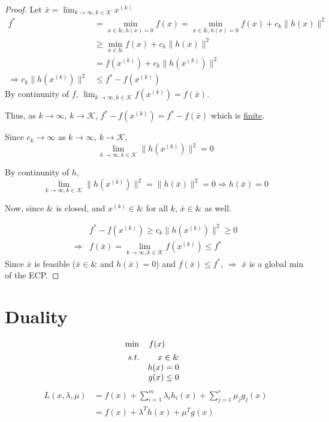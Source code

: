 \documentclass[11pt,a4paper]{article}
\begin{document}
\begin{proof}
    Let $\bar{x}=\lim_{k \rightarrow \infty, k\in \mathcal{K}}x^{(k)}$
    \begin{equation}
        \begin{aligned}
            f^*&=\min_{x\in\&,h(x)=0}f(x)=\min_{x\in\&,h(x)=0}f(x)+c_k\|h(x)\|^2\\
            &\geq \min_{x\in\&}f(x)+c_k\|h(x)\|^2\\
            &=f(x^{(k)})+c_k\|h(x^{(k)})\|^2\\
            \Rightarrow	c_k\|h(x^{(k)})\|^2&\leq f^*-f(x^{(k)})
        \end{aligned}
        \nonumber
    \end{equation}
    By continunity of $f$, $\lim_{k \rightarrow \infty, k\in \mathcal{K}}f(x^{(k)})=f(\bar{x})$.

    Thus, as $k \rightarrow	\infty$, $k \rightarrow	\mathcal{K}$, $f^*-f(x^{(k)})=f^*-f(\bar{x})$ which is \underline{finite}.

    Since $c_k \rightarrow \infty$ as $k \rightarrow	\infty$, $k \rightarrow	\mathcal{K}$, $$\lim_{k \rightarrow \infty, k\in \mathcal{K}}\|h(x^{(k)})\|^2=0$$

    By continunity of $h$,
    $$\lim_{k \rightarrow \infty, k\in \mathcal{K}}\|h(x^{(k)})\|^2=\|h(\bar{x})\|^2=0 \Rightarrow	h(\bar{x})=0$$

    Now, since $\&$ is closed, and $x^{(k)}\in \&$ for all $k$, $\bar{x}\in\&$ as well.

    \begin{equation}
        \begin{aligned}
            &f^*-f(x^{(k)})\geq c_k\|h(x^{(k)})\|^2\geq 0\\
            \Rightarrow	& f(\bar{x})=\lim_{k \rightarrow \infty, k\in \mathcal{K}}f(x^{(k)})\leq f^*
        \end{aligned}
        \nonumber
    \end{equation}
    Since $\bar{x}$ is feasible ($\bar{x}\in\&$ and $h(\bar{x})=0$) and $f(\bar{x})\leq f^*$, $\Rightarrow$ $\bar{x}$ is a global min of the ECP.
\end{proof}

\section{Duality}
\begin{align*}
    &\min\quad f(x)\\
    &\begin{array}{r@{\quad}r@{}l@{\quad}l}
    s.t.
    &x\in\&&\\
    &h(x)=0&\\
    &g(x)\leq 0&\\
\end{array}
\end{align*}
\begin{equation}
    \begin{aligned}
        L(x,\lambda,\mu)&=f(x)+\sum_{i=1}^m\lambda_i h_i(x)+\sum_{j=1}^r\mu_j g_j(x)\\
        &=f(x)+\lambda^T h(x)+\mu^T g(x)
    \end{aligned}
    \nonumber
\end{equation}
\end{document}
